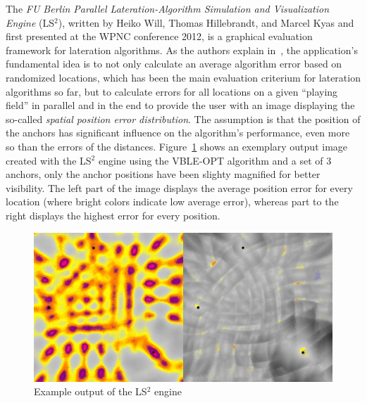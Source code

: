 The \emph{FU Berlin Parallel Lateration-Algorithm Simulation and Visualization Engine} (LS$^{2}$), written by Heiko Will, Thomas Hillebrandt, and Marcel Kyas and first presented at the WPNC conference 2012, is a graphical evaluation framework for lateration algorithms. As the authors explain in~\cite{will2012ls2}, the application's fundamental idea is to not only calculate an average algorithm error based on randomized locations, which has been the main evaluation criterium for lateration algorithms so far, but to calculate errors for all locations on a given ``playing field'' in parallel and in the end to provide the user with an image displaying the so-called \emph{spatial position error distribution}. The assumption is that the position of the anchors has significant influence on the algorithm's performance, even more so than the errors of the distances. Figure~\ref{fig:lateration} shows an exemplary output image created with the LS$^{2}$ engine using the VBLE-OPT algorithm and a set of 3 anchors, only the anchor positions have been slighty magnified for better visibility. The left part of the image displays the average position error for every location (where bright colors indicate low average error), whereas part to the right displays the highest error for every position.

\begin{figure}[h]
\begin{center}
\includegraphics[width=14cm]{img/lateration}
\end{center}
\caption{Example output of the LS$^{2}$ engine}
\label{fig:lateration}
\end{figure}

